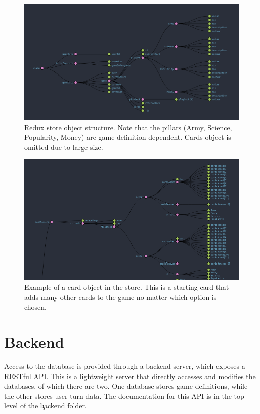 \begin{figure}[!h]
	\centering
	\includegraphics[width=1.0\textwidth]{./images/design/store_shape.png}
	\caption{Redux store object structure. Note that the pillars (Army, Science, Popularity, Money) are game definition dependent. Cards object is omitted due to large size.}
	\label{fig:store_shape}
\end{figure}

\begin{figure}[!h]
	\centering
	\includegraphics[width=1.0\textwidth]{./images/design/card_example.png}
	\caption{Example of a card object in the store. This is a starting card that adds many other cards to the game no matter which option is chosen.}
	\label{fig:card_example}
\end{figure}

\section{Backend}
Access to the database is provided through a backend server, which exposes a RESTful \cite{REST} API. This is a lightweight server that directly accesses and modifies the databases, of which there are two. One database stores game definitions, while the other stores user turn data.
The documentation for this API is in the top level of the \c{backend} folder.
